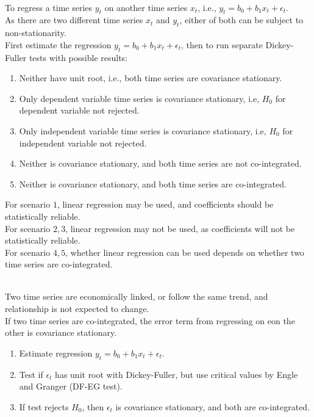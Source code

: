 \begin{remark} \\
To regress a time series $y_t$ on another time series $x_t$, i.e., $y_t = b_0 + b_1 x_t + \epsilon_t$.\\
As there are two different time series $x_t$ and $y_t$, either of both can be subject to non-stationarity.\\
First estimate the regression $y_t = b_0 + b_1 x_t + \epsilon_t$, then to run separate Dickey-Fuller tests with possible results:
\begin{enumerate}[label=\roman*.]
\setlength{\itemsep}{0pt}
\item Neither have unit root, i.e., both time series are covariance stationary.
\item Only dependent variable time series is covariance stationary, i.e, $H_0$ for dependent variable not rejected.
\item Only independent variable time series is covariance stationary, i.e, $H_0$ for independent variable not rejected.
\item Neither is covariance stationary, and both time series are not co-integrated.
\item Neither is covariance stationary, and both time series are co-integrated.
\end{enumerate}
For scenario $1$, linear regression may be used, and coefficients should be statistically reliable.\\
For scenario $2, 3$, linear regression may not be used, as coefficients will not be statistically reliable.\\
For scenario $4, 5$, whether linear regression can be used depends on whether two time series are co-integrated.
\end{remark}

\begin{definition} \\
Two time series are economically linked, or follow the same trend, and relationship is not expected to change.\\
If two time series are co-integrated, the error term from regressing on eon the other is covariance stationary.
\begin{enumerate}[label=\roman*.]
\setlength{\itemsep}{0pt}
\item Estimate regression $y_t = b_0 + b_1 x_t + \epsilon_t$.
\item Test if $\epsilon_t$ has unit root with Dickey-Fuller, but use critical values by Engle and Granger (DF-EG test).
\item If test rejects $H_0$, then $\epsilon_t$ is covariance stationary, and both are co-integrated.
\end{enumerate}
\end{definition}

